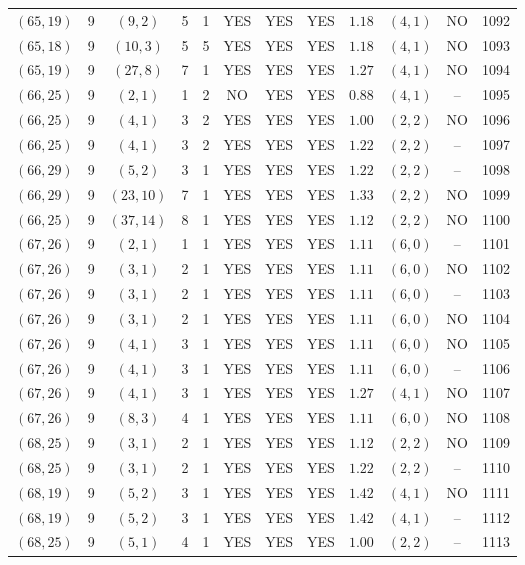 \begin{longtable}{|c|c|c|c|c|c|c|c|c|c|c|c|}
$(65,19)$ & 9 & $(9,2)$ & 5 & 1 & YES & YES & YES & $1.18$ & $(4,1)$ & NO & 1092\\
$(65,18)$ & 9 & $(10,3)$ & 5 & 5 & YES & YES & YES & $1.18$ & $(4,1)$ & NO & 1093\\
$(65,19)$ & 9 & $(27,8)$ & 7 & 1 & YES & YES & YES & $1.27$ & $(4,1)$ & NO & 1094\\
$(66,25)$ & 9 & $(2,1)$ & 1 & 2 & NO & YES & YES & $0.88$ & $(4,1)$ & -- & 1095\\
$(66,25)$ & 9 & $(4,1)$ & 3 & 2 & YES & YES & YES & $1.00$ & $(2,2)$ & NO & 1096\\
$(66,25)$ & 9 & $(4,1)$ & 3 & 2 & YES & YES & YES & $1.22$ & $(2,2)$ & -- & 1097\\
$(66,29)$ & 9 & $(5,2)$ & 3 & 1 & YES & YES & YES & $1.22$ & $(2,2)$ & -- & 1098\\
$(66,29)$ & 9 & $(23,10)$ & 7 & 1 & YES & YES & YES & $1.33$ & $(2,2)$ & NO & 1099\\
$(66,25)$ & 9 & $(37,14)$ & 8 & 1 & YES & YES & YES & $1.12$ & $(2,2)$ & NO & 1100\\
$(67,26)$ & 9 & $(2,1)$ & 1 & 1 & YES & YES & YES & $1.11$ & $(6,0)$ & -- & 1101\\
$(67,26)$ & 9 & $(3,1)$ & 2 & 1 & YES & YES & YES & $1.11$ & $(6,0)$ & NO & 1102\\
$(67,26)$ & 9 & $(3,1)$ & 2 & 1 & YES & YES & YES & $1.11$ & $(6,0)$ & -- & 1103\\
$(67,26)$ & 9 & $(3,1)$ & 2 & 1 & YES & YES & YES & $1.11$ & $(6,0)$ & NO & 1104\\
$(67,26)$ & 9 & $(4,1)$ & 3 & 1 & YES & YES & YES & $1.11$ & $(6,0)$ & NO & 1105\\
$(67,26)$ & 9 & $(4,1)$ & 3 & 1 & YES & YES & YES & $1.11$ & $(6,0)$ & -- & 1106\\
$(67,26)$ & 9 & $(4,1)$ & 3 & 1 & YES & YES & YES & $1.27$ & $(4,1)$ & NO & 1107\\
$(67,26)$ & 9 & $(8,3)$ & 4 & 1 & YES & YES & YES & $1.11$ & $(6,0)$ & NO & 1108\\
$(68,25)$ & 9 & $(3,1)$ & 2 & 1 & YES & YES & YES & $1.12$ & $(2,2)$ & NO & 1109\\
$(68,25)$ & 9 & $(3,1)$ & 2 & 1 & YES & YES & YES & $1.22$ & $(2,2)$ & -- & 1110\\
$(68,19)$ & 9 & $(5,2)$ & 3 & 1 & YES & YES & YES & $1.42$ & $(4,1)$ & NO & 1111\\
$(68,19)$ & 9 & $(5,2)$ & 3 & 1 & YES & YES & YES & $1.42$ & $(4,1)$ & -- & 1112\\
$(68,25)$ & 9 & $(5,1)$ & 4 & 1 & YES & YES & YES & $1.00$ & $(2,2)$ & -- & 1113\\

\end{longtable}

